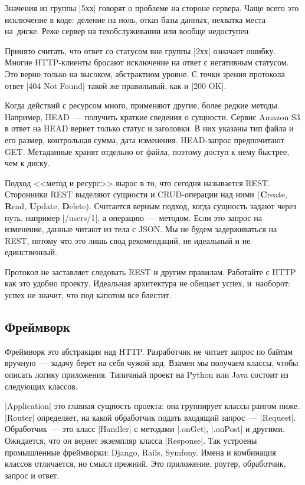 Значения из группы \spverb|5хх| говорят о проблеме на стороне сервера. Чаще всего
это исключение в коде: деление на ноль, отказ базы данных, нехватка места
на~диске. Реже сервер на техобслуживании или вообще недоступен.

Принято считать, что ответ со статусом вне группы \spverb|2хх| означает
ошибку. Многие HTTP-клиенты бросают исключение на ответ с негативным статусом.
Это верно только на высоком, абстрактном уровне. С точки зрения протокола ответ
\spverb|404 Not Found| такой же правильный, как и \spverb|200 OK|.

Когда действий с ресурсом много, применяют другие, более редкие
методы. Например, HEAD~--- получить краткие сведения о сущности. Сервис Amazon
S3 в ответ на HEAD вернет только статус и заголовки. В них указаны тип файла и
его размер, контрольная сумма, дата изменения. HEAD-запрос предпочитают
GET. Метаданные хранят отдельно от файла, поэтому доступ к нему быстрее, чем к
диску.

Подход <<метод и ресурс>> вырос в то, что сегодня называется
REST. Сторонники REST выделяют сущности и
CRUD-операции над ними (\textbf{C}reate, \textbf{R}ead, \textbf{U}pdate,
\textbf{D}elete). Считается верным подход, когда сущность задают через путь,
например \spverb|/users/1|, а операцию~--- методом. Если это запрос на
изменение, данные читают из тела с JSON. Мы не будем задерживаться на REST,
потому что это лишь свод рекомендаций, не идеальный и не единственный.

Протокол не заставляет следовать REST и другим правилам. Работайте с HTTP как
это удобно проекту. Идеальная архитектура не обещает успех, и~наоборот: успех не
значит, что под капотом все блестит.

\subsection{Фреймворк}

Фреймворк это абстракция над HTTP. Разработчик не читает запрос по байтам
вручную~--- задачу берет на себя чужой код. Взамен мы получаем классы, чтобы
описать логику приложения. Типичный проект на Python или Java состоит из
следующих классов.

\spverb|Application| это главная сущность проекта: она группирует классы рангом
ниже. \spverb|Router| определяет, на какой обработчик подать входящий запрос~---
\spverb|Request|. Обработчик~--- это класс \spverb|Handler| с методами
\spverb|.onGet|, \spverb|.onPost| и другими. Ожидается, что он вернет экземпляр
класса \spverb|Response|. Так устроены промышленные фреймворки: Django, Rails,
Symfony. Имена и комбинация классов отличается, но смысл прежний. Это
приложение, роутер, обработчик, запрос и ответ.

